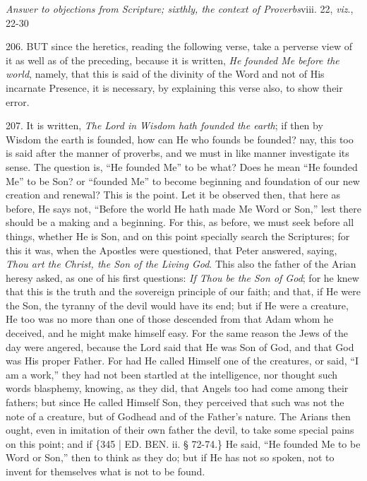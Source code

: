 
\emph{Answer
to objections from Scripture; sixthly, the context of Proverbs}viii.
22, \emph{viz}., 22-30

206. BUT
since the heretics, reading the following verse, take a perverse view
of it as well as of the preceding, because it is written, \emph{He
founded Me before the world}, namely, that this is said of the
divinity of the Word and not of His incarnate Presence, it is
necessary, by explaining this verse also, to show their error.

207. It is written, \emph{The
Lord in Wisdom hath founded the earth}; if then by Wisdom the earth
is founded, how can He who founds be founded? nay, this too is said
after the manner of proverbs, and we must in like manner investigate
its sense. The question is, ``He founded Me'' to be what? Does he mean ``He
founded Me'' to be Son? or ``founded Me'' to become beginning and
foundation of our new creation and renewal? This is the point. Let it
be observed then, that here as before, He says not, ``Before the world
He hath made Me Word or Son,'' lest there should be a making and a
beginning. For this, as before, we must seek before all things,
whether He is Son, and on this point specially search the Scriptures;
for this it was, when the Apostles were questioned, that Peter
answered, saying, \emph{Thou art the Christ, the Son of the Living God}.
This also the father of the Arian heresy asked, as one of his first
questions: \emph{If Thou be the Son of God}; for he knew that this is
the truth and the sovereign principle of our faith; and that, if He
were the Son, the tyranny of the devil would have its end; but if He
were a creature, He too was no more than one of those descended from
that Adam whom he deceived, and he might make himself easy. For the
same reason the Jews of the day were angered, because the Lord said
that He was Son of God, and that God was His proper Father. For had He
called Himself one of the creatures, or said, ``I am a work,'' they had
not been startled at the intelligence, nor thought such words
blasphemy, knowing, as they did, that Angels too had come among their
fathers; but since He called Himself Son, they perceived that such was
not the note of a creature, but of Godhead and of the Father's nature.
The Arians then ought, even in imitation of their own father the
devil, to take some special pains on this point; and if \{345 | ED. BEN.
ii. § 72-74.\} He said, ``He founded Me to be Word or Son,'' then to
think as they do; but if He has not so spoken, not to invent for
themselves what is not to be found.

